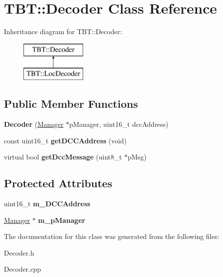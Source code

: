 \hypertarget{classTBT_1_1Decoder}{}\section{T\+BT\+:\+:Decoder Class Reference}
\label{classTBT_1_1Decoder}
Inheritance diagram for T\+BT\+:\+:Decoder\+:\begin{figure}[H]
\begin{center}
\leavevmode
\includegraphics[height=2.000000cm]{classTBT_1_1Decoder}
\end{center}
\end{figure}
\subsection*{Public Member Functions}
\begin{DoxyCompactItemize}
\item 
\mbox{\label{classTBT_1_1Decoder_a69cc50cb8ca993a98802303b1c70eade}} 
{\bfseries Decoder} (\hyperlink{classTBT_1_1Manager}{Manager} $\ast$p\+Manager, uint16\+\_\+t dcc\+Address)
\item 
\mbox{\label{classTBT_1_1Decoder_ad948e489ff1246effdfda3e68d693593}} 
const uint16\+\_\+t {\bfseries get\+D\+C\+C\+Address} (void)
\item 
\mbox{\label{classTBT_1_1Decoder_a71c25cd52e7f591ba1771ee0518735ba}} 
virtual bool {\bfseries get\+Dcc\+Message} (uint8\+\_\+t $\ast$p\+Msg)
\end{DoxyCompactItemize}
\subsection*{Protected Attributes}
\begin{DoxyCompactItemize}
\item 
\mbox{\label{classTBT_1_1Decoder_a14309179167dd46b722982301d651c4d}} 
uint16\+\_\+t {\bfseries m\+\_\+\+D\+C\+C\+Address}
\item 
\mbox{\label{classTBT_1_1Decoder_a400475d21ba933f8b91e6f7d3053518b}} 
\hyperlink{classTBT_1_1Manager}{Manager} $\ast$ {\bfseries m\+\_\+p\+Manager}
\end{DoxyCompactItemize}


The documentation for this class was generated from the following files\+:\begin{DoxyCompactItemize}
\item 
Decoder.\+h\item 
Decoder.\+cpp\end{DoxyCompactItemize}
